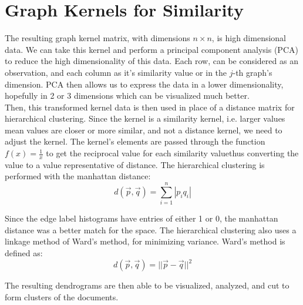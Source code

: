 %
%
%

\section{Graph Kernels for Similarity}

\hspace*{0.3cm} The resulting graph kernel matrix, with dimensions $n \times n$, is high dimensional data. We can take this kernel and perform a principal component analysis (PCA) to reduce the high dimensionality of this data. Each row, can be considered as an observation, and each column as it's similarity value or in the $j$-th graph's dimension. PCA then allows us to express the data in a lower dimensionality, hopefully in 2 or 3 dimensions which can be visualized much better. \\
Then, this transformed kernel data is then used in place of a distance matrix for hierarchical clustering. Since the kernel is a similarity kernel, i.e. larger values mean values are closer or more similar, and not a distance kernel, we need to adjust the kernel. The kernel's elements are passed through the function $f(x) = \frac{1}{x}$ to get the reciprocal value for each similarity value\textemdash thus converting the value to a value representative of distance. The hierarchical clustering is performed with the manhattan distance: \\

\begin{equation}
d(\vec{p},\vec{q}) = \sum_{i=1}^n |p_i q_i|
\end{equation}

Since the edge label histograms have entries of either 1 or 0, the manhattan distance was a better match for the space. The hierarchical clustering also uses a linkage method of Ward's method, for minimizing variance. Ward's method is defined as:\\

\begin{equation}
d(\vec{p},\vec{q}) = || \vec{p} - \vec{q} ||^2
\end{equation}

The resulting dendrograms are then able to be visualized, analyzed, and cut to form clusters of the documents. 